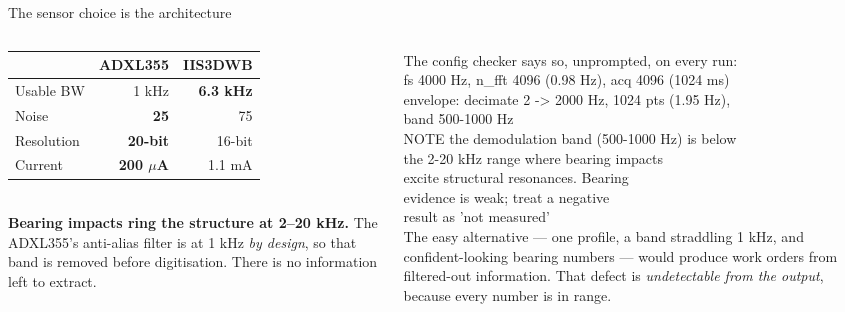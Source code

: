\documentclass[aspectratio=169,10pt]{beamer}
\begin{document}
\begin{frame}{The sensor choice is the architecture}
  \begin{columns}[T]
    \begin{column}{0.44\textwidth}
      \scriptsize
      \begin{tabular}{@{}lrr@{}}
        \toprule
        & \textbf{ADXL355} & IIS3DWB \\
        \midrule
        Usable BW   & 1 kHz & \textbf{6.3 kHz} \\
        Noise       & \textbf{25} & 75 \\
        Resolution  & \textbf{20-bit} & 16-bit \\
        Current     & \textbf{200 $\mu$A} & 1.1 mA \\
        \bottomrule
      \end{tabular}
      \\[2.5mm]
      \textbf{Bearing impacts ring the structure at 2--20 kHz.} The ADXL355's
      anti-alias filter is at 1 kHz \emph{by design}, so that band is removed
      before digitisation. There is no information left to extract.
    \end{column}
    \begin{column}{0.53\textwidth}
      \scriptsize
      The config checker says so, unprompted, on every run:
      \\[1mm]
      {\tiny\ttfamily
      fs 4000 Hz, n\_fft 4096 (0.98 Hz), acq 4096 (1024 ms)\\
      envelope: decimate 2 -> 2000 Hz, 1024 pts (1.95 Hz),\\
      \hphantom{envelope: }band 500-1000 Hz\\
      \textcolor{pdmcrit}{NOTE  the demodulation band (500-1000 Hz) is below}\\
      \textcolor{pdmcrit}{\hphantom{NOTE  }the 2-20 kHz range where bearing impacts}\\
      \textcolor{pdmcrit}{\hphantom{NOTE  }excite structural resonances. Bearing}\\
      \textcolor{pdmcrit}{\hphantom{NOTE  }evidence is weak; treat a negative}\\
      \textcolor{pdmcrit}{\hphantom{NOTE  }result as 'not measured'}
      }
      \\[2mm]
      The easy alternative --- one profile, a band straddling 1 kHz, and
      confident-looking bearing numbers --- would produce work orders from
      filtered-out information. That defect is \emph{undetectable from the
      output}, because every number is in range.
    \end{column}
  \end{columns}
\end{frame}
\end{document}
